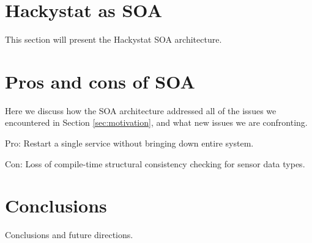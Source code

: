 \documentclass[conference,compsoc,peerreview]{IEEEtran}
\begin{document}
\section{Hackystat as SOA}
\label{sec:soa}

This section will present the Hackystat SOA architecture.

\section{Pros and cons of SOA}
\label{sec:discussion}

Here we discuss how the SOA architecture addressed all of the issues we encountered in Section \ref{sec:motivation}, and what new issues we are confronting. 

Pro: Restart a single service without bringing down entire system.

Con: Loss of compile-time structural consistency checking for sensor data types.

\section{Conclusions}
\label{sec:conclusion}

Conclusions and future directions. 




\end{document}
